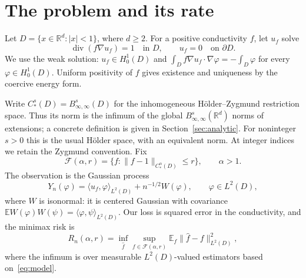 \documentclass[11pt]{article}
\theoremstyle{remark}
\newcommand{\R}{\mathbb R}
\newcommand{\E}{\mathbb E}
\newcommand{\cF}{\mathcal F}
\newcommand{\diver}{\operatorname{div}}
\newcommand{\norm}[1]{\lVert #1\rVert}
\newcommand{\abs}[1]{\lvert #1\rvert}
\newcommand{\ip}[2]{\langle #1,#2\rangle}
\begin{document}
\begin{abstract}
We consider recovery of a conductivity from a single solution of Darcy's equation on the unit ball, observed in Gaussian white noise of variance $n^{-1}$. For a sufficiently small fixed H\"older--Zygmund ball of smoothness $\alpha>1$ around the constant conductivity, we prove that the minimax squared $L^2$ risk has polynomial order $n^{-2\alpha/(2\alpha+d+3)}$ in every dimension $d\ge2$. The upper bound differs from the lower bound by at most $(\log n)^2$. The parameter class includes integer smoothness indices and has no prescribed conductivity trace. The lower bound uses localized angular perturbations and uniform nonlinear comparison. For the upper bound, inversion along a contracting gradient flow yields an integrated variance estimate that remains valid at the interior critical point. An independent pilot, a finite-dimensional correction, and boundary extrapolation give an estimator on the whole ball.
\end{abstract}

\section{The problem and its rate}
Let $D=\{x\in\R^d:\abs{x}<1\}$, where $d\ge2$. For a positive conductivity $f$, let $u_f$ solve
\begin{equation}\label{eq:pde}
 \diver(f\nabla u_f)=1\quad\text{in }D,
 \qquad u_f=0\quad\text{on }\partial D.
\end{equation}
We use the weak solution: $u_f\in H_0^1(D)$ and
$\int_D f\nabla u_f\cdot\nabla\varphi=-\int_D\varphi$ for every $\varphi\in H_0^1(D)$.
Uniform positivity of $f$ gives existence and uniqueness by the coercive energy form.

Write $C_*^s(D)=B^s_{\infty,\infty}(D)$ for the inhomogeneous H\"older--Zygmund restriction space. Thus its norm is the infimum of the global $B^s_{\infty,\infty}(\R^d)$ norms of extensions; a concrete definition is given in Section~\ref{sec:analytic}. For noninteger $s>0$ this is the usual H\"older space, with an equivalent norm. At integer indices we retain the Zygmund convention. Fix
\begin{equation}\label{eq:class}
 \cF(\alpha,r)=\{f:\norm{f-1}_{C_*^\alpha(D)}\le r\},
 \qquad \alpha>1.
\end{equation}
The observation is the Gaussian process
\begin{equation}\label{eq:model}
 Y_n(\varphi)=\ip{u_f}{\varphi}_{L^2(D)}+n^{-1/2}W(\varphi),
 \qquad \varphi\in L^2(D),
\end{equation}
where $W$ is isonormal: it is centered Gaussian with covariance
$\E W(\varphi)W(\psi)=\ip{\varphi}{\psi}_{L^2(D)}$.
Our loss is squared error in the conductivity, and the minimax risk is
\[
 R_n(\alpha,r)=\inf_{\widehat f}\sup_{f\in\cF(\alpha,r)}
 \E_f\norm{\widehat f-f}_{L^2(D)}^2,
\]
where the infimum is over measurable $L^2(D)$-valued estimators based on~\eqref{eq:model}.
\end{document}
